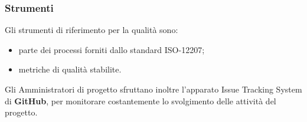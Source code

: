     \subsubsection{Strumenti}
      Gli strumenti di riferimento per la qualità sono:
      \begin{itemize}
      	\item{parte dei processi forniti dallo standard ISO-12207;}
      	\item{metriche di qualità stabilite.}
      \end{itemize}
  	  Gli Amministratori di progetto sfruttano inoltre l'apparato Issue Tracking System di \textbf{\mbox{GitHub}}, per monitorare costantemente lo svolgimento delle attività del progetto.

